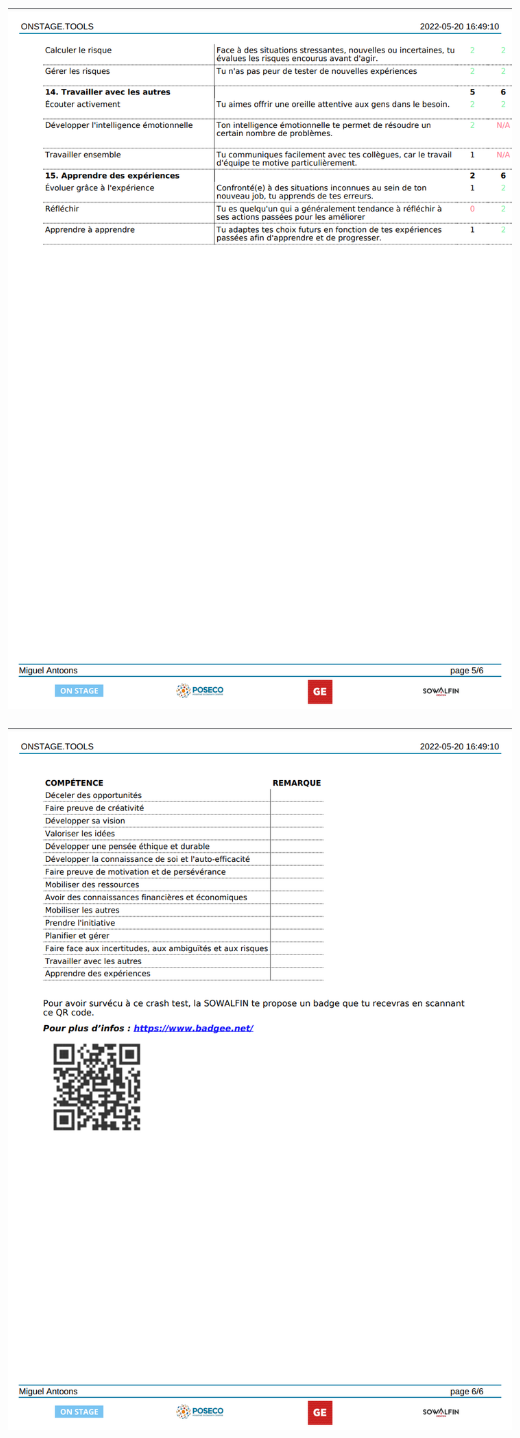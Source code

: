 \documentclass[11pt]{article}
\begin{document}
\includegraphics*[scale=0.34]{Screenshot from 2022-05-22 21-04-27.png}

\newpage

\includegraphics*[scale=0.34]{Screenshot from 2022-05-22 21-04-33.png}
\end{document}
